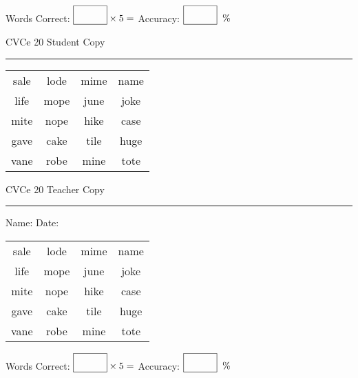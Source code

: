 \documentclass{memoir}
\begin{document}
\small

Words Correct: $\fbox{\phantom{\huge 100}} \times 5 = $ Accuracy: $\fbox{\phantom{\huge 100}}\;\; \%$ 

\vfill

\newpage



\footnotesize \noindent
CVCe 20 \hfill Student Copy
\smallskip
\hrule

\Large

\setlength{\tabcolsep}{14pt}
\def\arraystretch{2}

{\selectfont


\begin{vplace}[0.5]
\begin{center}
\begin{tabular}{cccc}
sale & lode & mime & name \\
life & mope & june & joke \\
mite & nope & hike & case \\
gave & cake & tile & huge \\
vane & robe & mine & tote \\
\end{tabular}
\end{center}
\end{vplace}

}

\newpage

\footnotesize \noindent
CVCe 20 \hfill Teacher Copy
\smallskip
\hrule

\small

\vfill

\noindent
Name: \underline{\hspace{1.75in}} \hfill Date: \underline{\hspace{1in}}

\Large

{\selectfont


\begin{vplace}[0.5]
\begin{center}
\begin{tabular}{cccc}
sale & lode & mime & name \\
life & mope & june & joke \\
mite & nope & hike & case \\
gave & cake & tile & huge \\
vane & robe & mine & tote \\
\end{tabular}
\end{center}
\end{vplace}



}

\small

Words Correct: $\fbox{\phantom{\huge 100}} \times 5 = $ Accuracy: $\fbox{\phantom{\huge 100}}\;\; \%$ 

\vfill

\end{document}
